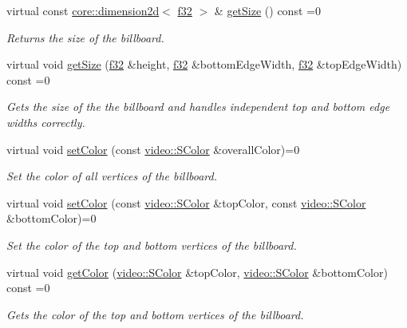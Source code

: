 \begin{DoxyCompactItemize}
virtual const \hyperlink{classirr_1_1core_1_1dimension2d}{core\+::dimension2d}$<$ \hyperlink{namespaceirr_a0277be98d67dc26ff93b1a6a1d086b07}{f32} $>$ \& \hyperlink{classirr_1_1scene_1_1IBillboardSceneNode_a466cfd24ccb0fb6c2216dbdc7228e3c0}{get\+Size} () const =0
\begin{DoxyCompactList}\small\item\em Returns the size of the billboard. \end{DoxyCompactList}\item 
virtual void \hyperlink{classirr_1_1scene_1_1IBillboardSceneNode_a79a636a0da637eaa9c061138f5ef3f68}{get\+Size} (\hyperlink{namespaceirr_a0277be98d67dc26ff93b1a6a1d086b07}{f32} \&height, \hyperlink{namespaceirr_a0277be98d67dc26ff93b1a6a1d086b07}{f32} \&bottom\+Edge\+Width, \hyperlink{namespaceirr_a0277be98d67dc26ff93b1a6a1d086b07}{f32} \&top\+Edge\+Width) const =0
\begin{DoxyCompactList}\small\item\em Gets the size of the the billboard and handles independent top and bottom edge widths correctly. \end{DoxyCompactList}\item 
virtual void \hyperlink{classirr_1_1scene_1_1IBillboardSceneNode_a82c1038a6dfcd255863baa96aaba4182}{set\+Color} (const \hyperlink{classirr_1_1video_1_1SColor}{video\+::\+S\+Color} \&overall\+Color)=0
\begin{DoxyCompactList}\small\item\em Set the color of all vertices of the billboard. \end{DoxyCompactList}\item 
virtual void \hyperlink{classirr_1_1scene_1_1IBillboardSceneNode_a13efdfa73998706baf10cedcdb48d559}{set\+Color} (const \hyperlink{classirr_1_1video_1_1SColor}{video\+::\+S\+Color} \&top\+Color, const \hyperlink{classirr_1_1video_1_1SColor}{video\+::\+S\+Color} \&bottom\+Color)=0
\begin{DoxyCompactList}\small\item\em Set the color of the top and bottom vertices of the billboard. \end{DoxyCompactList}\item 
virtual void \hyperlink{classirr_1_1scene_1_1IBillboardSceneNode_a0b2729cc4913b0890ae28cf0ef0ab949}{get\+Color} (\hyperlink{classirr_1_1video_1_1SColor}{video\+::\+S\+Color} \&top\+Color, \hyperlink{classirr_1_1video_1_1SColor}{video\+::\+S\+Color} \&bottom\+Color) const =0
\begin{DoxyCompactList}\small\item\em Gets the color of the top and bottom vertices of the billboard. \end{DoxyCompactList}\item 

\end{DoxyCompactItemize}
